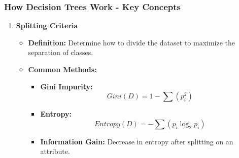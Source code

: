 \documentclass[aspectratio=169]{beamer}
\begin{document}
\begin{frame}[fragile]
    \frametitle{How Decision Trees Work - Key Concepts}
    \begin{enumerate}
        \item \textbf{Splitting Criteria}
        \begin{itemize}
            \item \textbf{Definition:} Determine how to divide the dataset to maximize the separation of classes.
            \item \textbf{Common Methods:}
            \begin{itemize}
                \item \textbf{Gini Impurity:}
                \begin{equation}
                    Gini(D) = 1 - \sum (p_i^2)
                \end{equation}
                \item \textbf{Entropy:}
                \begin{equation}
                    Entropy(D) = -\sum (p_i \log_2 p_i)
                \end{equation}
                \item \textbf{Information Gain:} Decrease in entropy after splitting on an attribute.
            \end{itemize}
        \end{itemize}
    \end{enumerate}
\end{frame}
\end{document}

